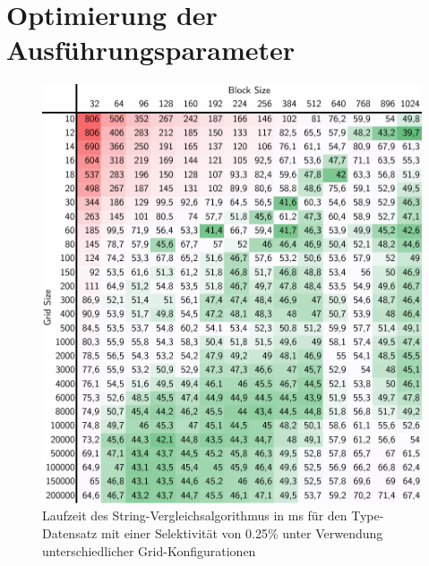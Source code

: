 \chapter{Optimierung der Ausführungsparameter}

\begin{figure}[ht]
	\includegraphics[]{bilder/parameter025.pdf}
	\caption{Laufzeit des String-Vergleichsalgorithmus in ms für den Type-Datensatz mit einer Selektivität von 0.25\% unter Verwendung unterschiedlicher Grid-Konfigurationen}
	\label{gpu_architecture}
\end{figure}